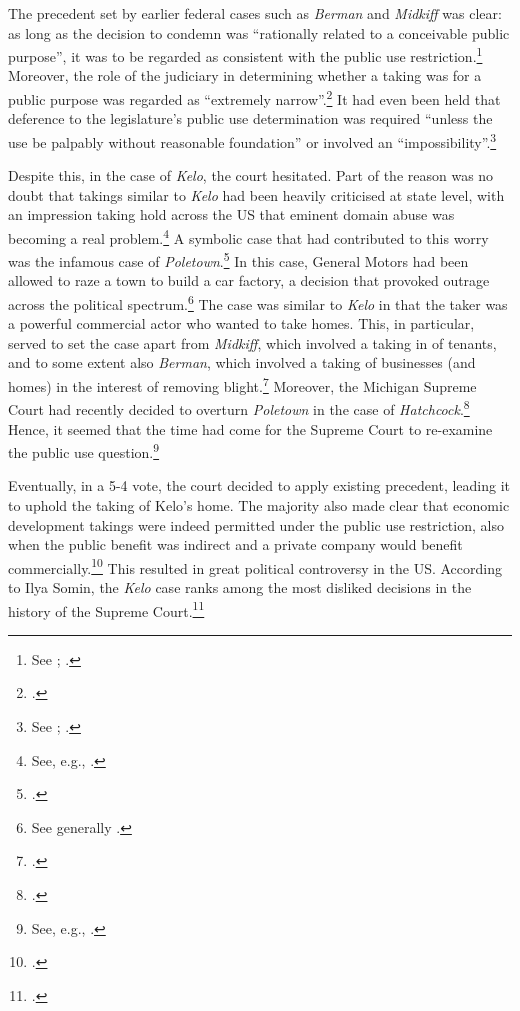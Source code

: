 The precedent set by earlier federal cases such as {\it Berman} and {\it Midkiff} was clear: as long as the decision to condemn was ``rationally related to a conceivable public purpose'', it was to be regarded as consistent with the public use restriction.\footnote{See \cite[241]{midkiff84}; \cite{berman54}.} Moreover, the role of the judiciary in determining whether a taking was for a public purpose was regarded as ``extremely narrow''.\footcite[32]{berman54} It had even been held that deference to the legislature's public use determination was required ``unless the use be palpably without reasonable foundation'' or involved an ``impossibility''.\footnote{See \cite[66]{dominion25}; \cite[680]{gettysburg96}.}

Despite this, in the case of {\it Kelo}, the court hesitated. Part of the reason was no doubt that takings similar to {\it Kelo} had been heavily criticised at state level, with an impression taking hold across the US that eminent domain abuse was becoming a real problem.\footnote{See, e.g., \cite[667-669]{sandefur05}.} A symbolic case that had contributed to this worry was the infamous case of {\it Poletown}.\footcite{poletown81} In this case, General Motors had been allowed to raze a town to build a car factory, a decision that provoked outrage across the political spectrum.\footnote{See generally \cite{sandefur05}.} The case was similar to {\it Kelo} in that the taker was a powerful commercial actor who wanted to take homes. This, in particular, served to set the case apart from {\it Midkiff}, which involved a taking in  of tenants, and to some extent also {\it Berman}, which involved a taking of businesses (and homes) in the interest of removing blight.\footnote{\cite{berman54,midkiff84}.} Moreover, the Michigan Supreme Court had recently decided to overturn {\it Poletown} in the case of {\it Hatchcock}.\footcite{wayne04} Hence, it seemed that the time had come for the Supreme Court to re-examine the public use question.\footnote{See, e.g., \cite{sandefur05,claeys04}.}

Eventually, in a 5-4 vote, the court decided to apply existing precedent, leading it to uphold the taking of Kelo's home. The majority also made clear that economic development takings were indeed permitted under the public use restriction, also when the public benefit was indirect and a private company would benefit commercially.\footcite[469-470]{kelo05} This resulted in great political controversy in the US. According to Ilya Somin, the {\it Kelo} case ranks among the most disliked decisions in the history of the Supreme Court.\footcite[2]{somin11} 

